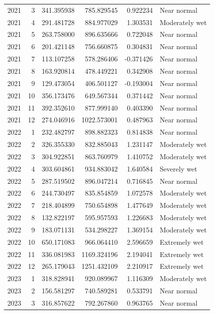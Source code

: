 \begin{tabular}{rrrrrl}
2021 & 3 & 341.395938 & 785.829545 & 0.922234 & Near normal \\
2021 & 4 & 291.481728 & 884.977029 & 1.303531 & Moderately wet \\
2021 & 5 & 263.758000 & 896.635666 & 0.722048 & Near normal \\
2021 & 6 & 201.421148 & 756.660875 & 0.304831 & Near normal \\
2021 & 7 & 113.107258 & 578.286406 & -0.371426 & Near normal \\
2021 & 8 & 163.920814 & 478.449221 & 0.342908 & Near normal \\
2021 & 9 & 129.473054 & 406.501127 & -0.193004 & Near normal \\
2021 & 10 & 356.173476 & 649.567344 & 0.371442 & Near normal \\
2021 & 11 & 392.352610 & 877.999140 & 0.403390 & Near normal \\
2021 & 12 & 274.046916 & 1022.573001 & 0.487963 & Near normal \\
2022 & 1 & 232.482797 & 898.882323 & 0.814838 & Near normal \\
2022 & 2 & 326.355330 & 832.885043 & 1.231147 & Moderately wet \\
2022 & 3 & 304.922851 & 863.760979 & 1.410752 & Moderately wet \\
2022 & 4 & 303.604861 & 934.883042 & 1.640584 & Severely wet \\
2022 & 5 & 287.519502 & 896.047214 & 0.716845 & Near normal \\
2022 & 6 & 244.730497 & 835.854859 & 1.072578 & Moderately wet \\
2022 & 7 & 218.404899 & 750.654898 & 1.477649 & Moderately wet \\
2022 & 8 & 132.822197 & 595.957593 & 1.226683 & Moderately wet \\
2022 & 9 & 183.071131 & 534.298227 & 1.369154 & Moderately wet \\
2022 & 10 & 650.171083 & 966.064410 & 2.596659 & Extremely wet \\
2022 & 11 & 336.081983 & 1169.324196 & 2.194041 & Extremely wet \\
2022 & 12 & 265.179043 & 1251.432109 & 2.210917 & Extremely wet \\
2023 & 1 & 318.828941 & 920.089967 & 1.116309 & Moderately wet \\
2023 & 2 & 156.581297 & 740.589281 & 0.533791 & Near normal \\
2023 & 3 & 316.857622 & 792.267860 & 0.963765 & Near normal \\

\end{tabular}
